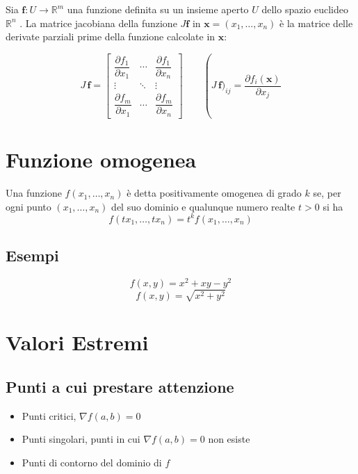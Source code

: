 Sia $\mathbf{f}: U \rightarrow \mathbb R^m$ una funzione definita su un insieme aperto $U$ dello spazio euclideo  $\mathbb R^n$ . La matrice jacobiana della funzione $J {\mathbf f}$ in $\mathbf x = (x_1, \dots, x_n)$ è la matrice delle derivate parziali prime della funzione calcolate in $\mathbf x$:

$$J \, \mathbf f = \begin{bmatrix} \dfrac{\partial f_1}{\partial x_1} & \cdots & \dfrac{\partial f_1}{\partial x_n} \\ \vdots & \ddots & \vdots \\ \dfrac{\partial f_m}{\partial x_1} & \cdots & \dfrac{\partial f_m}{\partial x_n}  \end{bmatrix}\qquad \operatorname (J \, \mathbf f)_{ij} = \frac{\partial f_i (\mathbf {x})}{\partial x_j} $$

\section{Funzione omogenea}

\begin{definition}
Una funzione $f(x_1, \ldots, x_n)$ è detta positivamente omogenea di grado $k$ se, per ogni punto $(x_1, \ldots, x_n)$ del suo dominio e qualunque numero realte $t>0$ si ha
$$ f(tx_1, \ldots, tx_n) = t^k f(x_1, \ldots, x_n)$$

\subsection{Esempi}

$$f(x,y) = x^2 + xy - y^2$$
$$f(x,y) = \sqrt{x^2 + y^2}$$

\end{definition}

\section{Valori Estremi}

\subsection{Punti a cui prestare attenzione}

\begin{itemize}
\item Punti critici, $\nabla f(a,b) = 0$
\item Punti singolari, punti in cui $\nabla f(a,b) = 0$ non esiste
\item Punti di contorno del dominio di $f$
\end{itemize}

